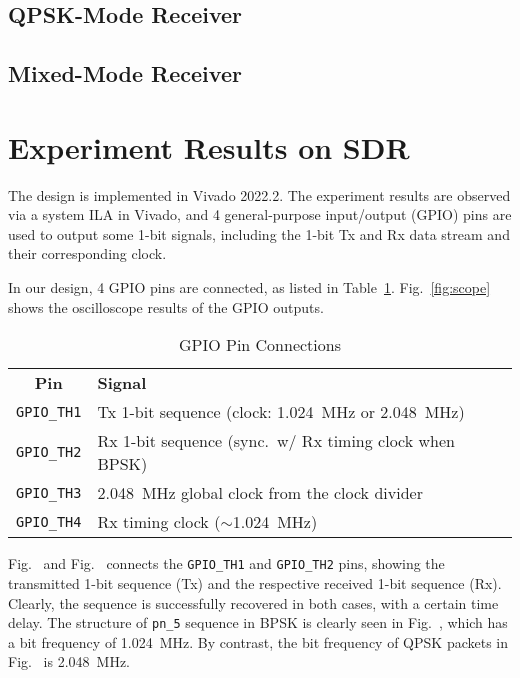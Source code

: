 \documentclass[journal,twoside]{IEEEtran}
\newcommand{\tabvertspace}{\specialrule{0em}{0.08em}{.08em}}
\begin{document}
    \subsection{QPSK-Mode Receiver}

    \subsection{Mixed-Mode Receiver}

  \section{Experiment Results on SDR}

    The design is implemented in Vivado 2022.2.
    The experiment results are observed via a system ILA in Vivado,
    and 4 general-purpose input/output (GPIO) pins are used to output some 1-bit signals,
    including the 1-bit Tx and Rx data stream and their corresponding clock.

    In our design, 4 GPIO pins are connected, as listed in Table~\ref{tab:gpio_pins}.
    Fig.~\ref{fig:scope} shows the oscilloscope results of the GPIO outputs.
    \begin{table}[htbp]
      \caption{GPIO Pin Connections}
      \label{tab:gpio_pins}
      \renewcommand{\arraystretch}{1.2}
      \begin{tabularx}{\linewidth}{cX}
        \toprule\tabvertspace
        \textbf{Pin} & \textbf{Signal} \\
        \tabvertspace\midrule
        \texttt{GPIO\_TH1} & Tx 1-bit sequence (clock: \qty{1.024}{MHz} or \qty{2.048}{MHz}) \\
        \texttt{GPIO\_TH2} & Rx 1-bit sequence (sync.\ w/ Rx timing clock when BPSK) \\
        \texttt{GPIO\_TH3} & \qty{2.048}{MHz} global clock from the clock divider \\
        \texttt{GPIO\_TH4} & Rx timing clock ($\sim$\qty{1.024}{MHz}) \\
        \bottomrule
      \end{tabularx}
    \end{table}

    Fig.~ and Fig.~
    connects the \texttt{GPIO\_TH1} and \texttt{GPIO\_TH2} pins,
    showing the transmitted 1-bit sequence (Tx) and the respective received 1-bit sequence (Rx).
    Clearly, the sequence is successfully recovered in both cases, with a certain time delay.
    The structure of \texttt{pn\_5} sequence in BPSK is clearly seen in Fig.~,
    which has a bit frequency of \qty{1.024}{MHz}.
    By contrast, the bit frequency of QPSK packets in Fig.~ is \qty{2.048}{MHz}.
\end{document}
